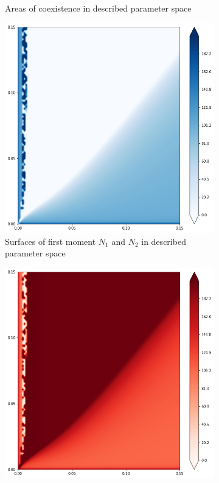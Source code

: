 \begin{figure}[ht]
\begin{subfigure}{.5\textwidth}
		\caption{Areas of coexistence in described parameter space} 
		\label{fig:hmd1:sub2}
	\end{subfigure}
\begin{subfigure}{.5\textwidth}
	\centering
	\includegraphics[width=.93\linewidth]{hm_d1_n1.png}
	\caption{Surfaces of first moment \(N_1\) and \(N_2\) in described parameter space}
	\label{fig:hmd1:sub3}
\end{subfigure}%
\begin{subfigure}{.5\textwidth}
	\centering
	\includegraphics[width=.93\linewidth]{hm_d1_n2.png}

\end{subfigure}
\end{figure}
